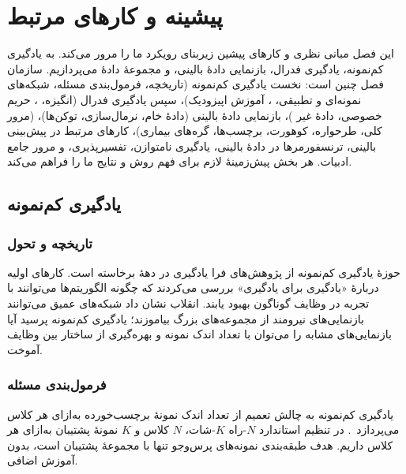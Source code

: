 \chapter{پیشینه و کارهای مرتبط}
\label{ch:background}

این فصل مبانی نظری و کارهای پیشین زیربنای رویکرد ما را مرور می‌کند. به یادگیری کم‌نمونه، یادگیری فدرال، بازنمایی دادۀ بالینی، و مجموعۀ دادۀ  می‌پردازیم. سازمان فصل چنین است: نخست یادگیری کم‌نمونه (تاریخچه، فرمول‌بندی مسئله، شبکه‌های نمونه‌ای و تطبیقی، ، آموزش اپیزودیک)، سپس یادگیری فدرال (انگیزه، ، حریم خصوصی، دادۀ غیر )، بازنمایی دادۀ بالینی (دادۀ خام، نرمال‌سازی، توکن‌ها)،  (مرور کلی، طرحواره، کوهورت، برچسب‌ها، گره‌های بیماری)، کارهای مرتبط در پیش‌بینی بالینی، ترنسفورمرها در دادۀ بالینی، یادگیری نامتوازن، تفسیرپذیری، و مرور جامع ادبیات. هر بخش پیش‌زمینۀ لازم برای فهم روش و نتایج ما را فراهم می‌کند.

\section{یادگیری کم‌نمونه}

\subsection{تاریخچه و تحول}

حوزۀ یادگیری کم‌نمونه از پژوهش‌های فرا یادگیری در دهۀ  برخاسته است. کارهای اولیه دربارۀ «یادگیری برای یادگیری» بررسی می‌کردند که چگونه الگوریتم‌ها می‌توانند با تجربه در وظایف گوناگون بهبود یابند. انقلاب  نشان داد شبکه‌های عمیق می‌توانند بازنمایی‌های نیرومند از مجموعه‌های بزرگ بیاموزند؛ یادگیری کم‌نمونه پرسید آیا بازنمایی‌های مشابه را می‌توان با تعداد اندک نمونه و بهره‌گیری از ساختار بین وظایف آموخت.

\subsection{فرمول‌بندی مسئله}

یادگیری کم‌نمونه به چالش تعمیم از تعداد اندک نمونۀ برچسب‌خورده به‌ازای هر کلاس می‌پردازد~\cite{snell2017prototypical}. در تنظیم استاندارد $N$-راه $K$-شات، $N$ کلاس و $K$ نمونۀ پشتیبان به‌ازای هر کلاس داریم. هدف طبقه‌بندی نمونه‌های پرس‌وجو تنها با مجموعۀ پشتیبان است، بدون آموزش اضافی.

